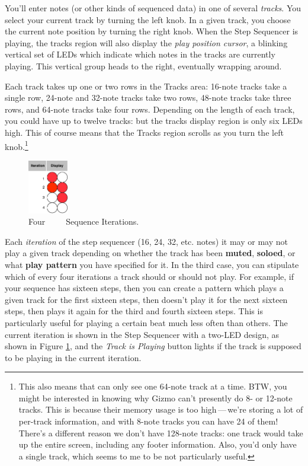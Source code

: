 \documentclass{article}
\begin{document}
You'll enter notes (or other kinds of sequenced data) in one of several {\it tracks}. You select your current track by turning the left knob.  In a given track, you choose the current note position by turning the right knob.  When the Step Sequencer is playing, the  tracks region will also display the {\it play position cursor}, a blinking vertical set of LEDs which indicate which notes in the tracks are currently playing.  This vertical group heads to the right, eventually wrapping around. 

Each track takes up one or two rows in the Tracks area: 16-note tracks take a single row, 24-note and 32-note tracks take two rows, 48-note tracks take three rows, and 64-note tracks take four rows.    Depending on the length of each track, you could have  up to twelve tracks: but the tracks display region is only six LEDs high.  This of course means that  the Tracks region scrolls as you turn the left knob.\footnote{This also means that can only see one 64-note track at a time.  BTW, you might be interested in knowing why Gizmo can't presently do 8- or 12-note tracks.  This is because their memory usage is too high\,---\,we're storing a lot of per-track information, and with 8-note tracks you can have 24 of them!  There's a different reason we don't have 128-note tracks: one track would take up the entire screen, including any footer information.  Also, you'd only have a single track, which seems to me to be not particularly useful.}

\vspace{10in}

\begin{figure}
\hspace{\fill}\includegraphics[width=0.7in]{Patterns}\hspace{\fill}%
\vspace{-1em}
\caption{\small Four\ \ \ \ \ Sequence Iterations.}\vspace{-1em}
\label{iterations}
\end{figure}

Each {\it iteration} of the step sequencer (16, 24, 32, etc. notes) it may or may not play a given track depending on whether the track has been {\bf muted}, {\bf soloed}, or what {\bf play pattern} you have specified for it.  In the third case, you can stipulate which of every four iterations a track should or should not play.  For example, if your sequence has sixteen steps, then you can create a pattern which plays a given track for the first sixteen steps, then doesn't play it for the next sixteen steps, then plays it again for the third and fourth sixteen steps.  This is particularly useful for playing a certain beat much less often than others.  The current iteration is shown in the Step Sequencer with a two-LED design, as shown in Figure \ref{iterations}, and the {\it Track is Playing} button lights if the track is supposed to be playing in the current iteration.
\end{document}
